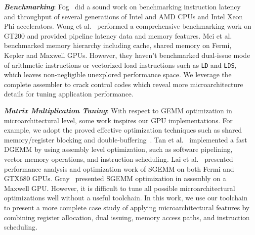 {\em {\bf Benchmarking}}: 
Fog~\cite{fog} did a sound work on benchmarking instruction latency and throughput of several generations of Intel and AMD CPUs and Intel Xeon Phi accelerators. %
Wong et al.~\cite{wong} performed a 
comprehensive benchmarking work on GT200 and provided pipeline latency data and
memory features. Mei et al.~\cite{mei} benchmarked memory hierarchy including cache, shared memory on Fermi, Kepler and Maxwell GPUs.
However, they haven't benchmarked dual-issue mode of arithmetic instructions or vectorized load instructions such as {\tt LD} and {\tt LDS}, which leaves non-negligible unexplored performance space. 
We leverage the complete assembler to crack control codes which reveal more microarchitecture details for tuning application performance.

{\em {\bf Matrix Multiplication Tuning}}: With respect to GEMM optimization in microarchitectural level, some work inspires our GPU implementations. 
For example, we adopt the proved effective optimization techniques such as shared memory/register 
blocking and double-buffering~\cite{volkov,tan}. 
Tan et al.~\cite{tan} implemented a fast DGEMM by using 
assembly level optimization, such as software pipelining, vector memory operations, and instruction scheduling. 
Lai et al.~\cite{lai} presented performance analysis and optimization work of SGEMM on both Fermi and GTX680 GPUs. 
Gray~\cite{nervana_sgemm_wiki} presented SGEMM optimization in assembly on a Maxwell GPU. 
However, it is difficult to tune all possible microarchitectural optimizations well without a useful toolchain.
In this work, we use our toolchain to present a more complete case study of applying microarchitectural features by combining 
register allocation, dual issuing, memory access paths, and instruction scheduling.
